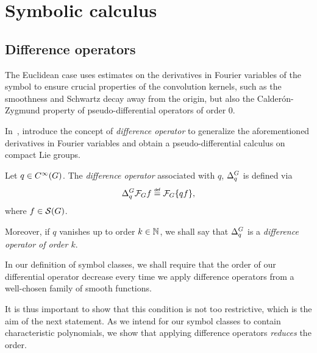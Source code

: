 \chapter{Symbolic calculus}
\label{chapter:symbolic_calculus}

\section{Difference operators}

The Euclidean case uses estimates on the derivatives in Fourier variables of the symbol
to ensure crucial properties of the convolution kernels,
such as the smoothness and Schwartz decay away from the origin,
but also the Calder\'on-Zygmund property of pseudo-differential operators of order $0$.

In~\cite{RuzhanskyTurunen10},
\citeauthor{RuzhanskyTurunen10} introduce the concept of \emph{difference operator}
to generalize the aforementioned derivatives in Fourier variables
and obtain a pseudo-differential calculus on compact Lie groups.

\begin{definition}
\label{definition:difference_operators}
    Let $q \in {C^\infty(G)}$.
    The \emph{difference operator} associated with $q$, ${\Delta^{G}_{q}}$ is defined via
    \begin{align*}
        \DifferenceOperator{q} \Fourier f \defeq \Fourier\{q f\},
    \end{align*}
    where $f \in {\mathcal{S} (G)}$.

    Moreover, if $q$ vanishes up to order $k \in \mathbb{N}$,
    we shall say that ${\Delta^{G}_{q}}$ is a \emph{difference operator of order $k$}.
\end{definition}

In our definition of symbol classes,
we shall require that the order of our differential operator decrease
every time we apply difference operators from a well-chosen family of smooth functions.

It is thus important to show that this condition is not too restrictive,
which is the aim of the next statement.
As we intend for our symbol classes to contain characteristic polynomials,
we show that applying difference operators \emph{reduces} the order.

